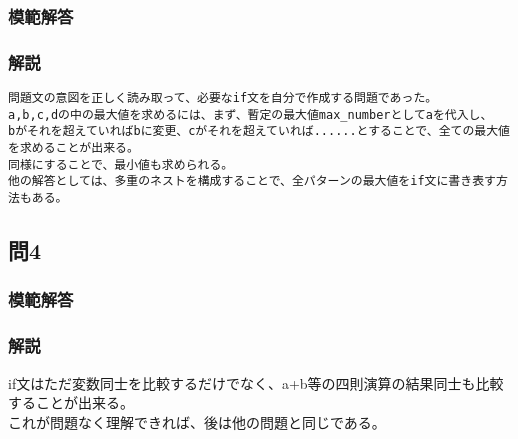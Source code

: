 \documentclass[a4j,titlepage,dvipdfmx]{jsarticle}   %
\newcommand{\codepath}{./code}
\begin{document}
\subsubsection{模範解答}

\subsubsection{解説}
\begin{verbatim}
問題文の意図を正しく読み取って、必要なif文を自分で作成する問題であった。
a,b,c,dの中の最大値を求めるには、まず、暫定の最大値max_numberとしてaを代入し、
bがそれを超えていればbに変更、cがそれを超えていれば......とすることで、全ての最大値を求めることが出来る。
同様にすることで、最小値も求められる。
他の解答としては、多重のネストを構成することで、全パターンの最大値をif文に書き表す方法もある。
\end{verbatim}
\subsection{問4}
\subsubsection{模範解答}

\subsubsection{解説}
if文はただ変数同士を比較するだけでなく、a+b等の四則演算の結果同士も比較することが出来る。\\
これが問題なく理解できれば、後は他の問題と同じである。\\
\end{document}
